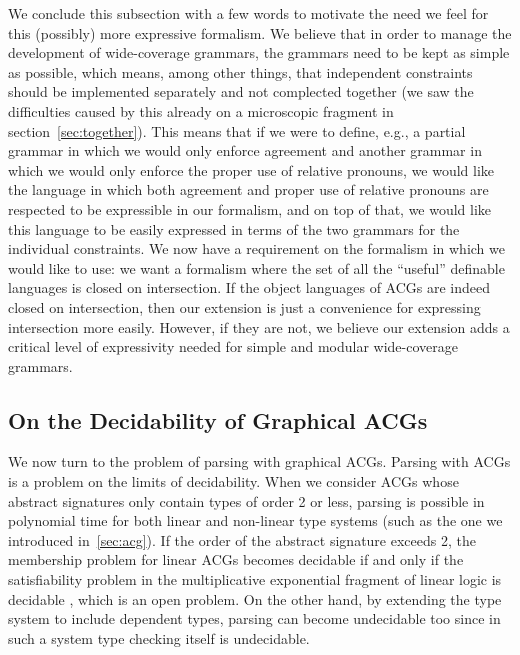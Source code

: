 We conclude this subsection with a few words to motivate the need we
feel for this (possibly) more expressive formalism. We believe that in
order to manage the development of wide-coverage grammars, the grammars
need to be kept as simple as possible, which means, among other things,
that independent constraints should be implemented separately and not
complected together (we saw the difficulties caused by this already on a
microscopic fragment in section~\ref{sec:together}). This means that if
we were to define, e.g., a partial grammar in which we would only
enforce agreement and another grammar in which we would only enforce the
proper use of relative pronouns, we would like the language in which
both agreement and proper use of relative pronouns are respected to be
expressible in our formalism, and on top of that, we would like this
language to be easily expressed in terms of the two grammars for the
individual constraints. We now have a requirement on the formalism in
which we would like to use: we want a formalism where the set of all the
``useful'' definable languages is closed on intersection. If the object
languages of ACGs are indeed closed on intersection, then our extension
is just a convenience for expressing intersection more easily. However,
if they are not, we believe our extension adds a critical level of
expressivity needed for simple and modular wide-coverage grammars.


\subsection{On the Decidability of Graphical ACGs}
\label{ssec:graphical-decidability}

We now turn to the problem of parsing with graphical ACGs. Parsing with
ACGs is a problem on the limits of decidability. When we consider ACGs
whose abstract signatures only contain types of order 2 or less, parsing
is possible in polynomial time for both linear
\cite{salvati2005problemes} and non-linear \cite{kanazawa2007parsing}
type systems (such as the one we introduced in~\ref{sec:acg}). If the
order of the abstract signature exceeds 2, the membership problem for
linear ACGs becomes decidable if and only if the satisfiability problem
in the multiplicative exponential fragment of linear logic is decidable
\cite{de2004vector}, which is an open problem. On the other hand, by
extending the type system to include dependent types, parsing can become
undecidable too since in such a system type checking itself is
undecidable.

